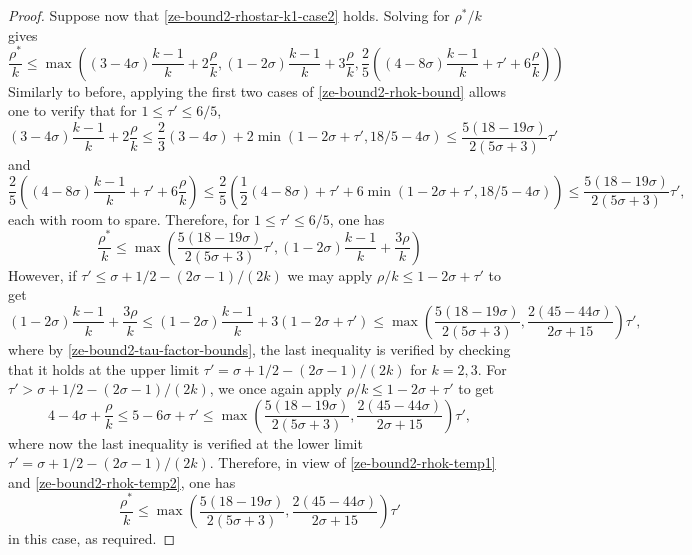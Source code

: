 \begin{proof}
Suppose now that \eqref{ze-bound2-rhostar-k1-case2} holds. Solving for $\rho^*/k$ gives 
\[
\frac{\rho^*}{k} \le \max\left((3 - 4\sigma)\frac{k - 1}{k} + 2\frac{\rho}{k}, (1 - 2\sigma)\frac{k - 1}{k} + 3\frac{\rho}{k}, \frac{2}{5}((4 - 8\sigma)\frac{k - 1}{k} + \tau' + 6\frac{\rho}{k})\right)
\]
Similarly to before, applying the first two cases of \eqref{ze-bound2-rhok-bound} allows one to verify that for $1 \le \tau' \le 6/5$,
\[
(3 - 4\sigma)\frac{k - 1}{k} + 2\frac{\rho}{k} \le \frac{2}{3}(3 - 4\sigma) + 2\min(1 - 2\sigma + \tau', 18/5 - 4\sigma) \le \frac{5(18-19\sigma)}{2(5\sigma+3)}\tau'
\]
and
\[
\frac{2}{5}((4 - 8\sigma)\frac{k - 1}{k} + \tau' + 6\frac{\rho}{k}) \le \frac{2}{5}(\frac{1}{2}(4 - 8\sigma) + \tau' + 6\min(1 - 2\sigma + \tau', 18/5 - 4\sigma)) \le \frac{5(18-19\sigma)}{2(5\sigma+3)}\tau',
\]
each with room to spare. Therefore, for $1 \le \tau' \le 6/5$, one has 
\begin{equation}\label{ze-bound2-rhok-temp2}
\frac{\rho^*}{k} \le \max\left(\frac{5(18 - 19\sigma)}{2(5\sigma + 3)}\tau', (1 - 2\sigma)\frac{k - 1}{k} + \frac{3\rho}{k}\right)
\end{equation}
    However, if $\tau' \le \sigma + 1/2 - (2\sigma - 1)/(2k)$ we may apply $\rho/k \le 1 - 2\sigma + \tau'$ to get 
    \[
    (1 - 2\sigma)\frac{k - 1}{k} + \frac{3\rho}{k} \le (1 - 2\sigma)\frac{k - 1}{k} + 3(1 - 2\sigma + \tau') \le \max\left(\frac{5(18 - 19\sigma)}{2(5\sigma + 3)}, \frac{2(45 - 44\sigma)}{2\sigma + 15}\right)\tau',
    \]
    where by \eqref{ze-bound2-tau-factor-bounds}, the last inequality is verified by checking that it holds at the upper limit $\tau' = \sigma + 1/2 - (2\sigma - 1)/(2k)$ for $k = 2,3$. For $\tau' > \sigma + 1/2 - (2\sigma - 1)/(2k)$, we once again apply $\rho/k \le 1 - 2\sigma + \tau'$ to get 
    \[
    4 - 4\sigma + \frac{\rho}{k} \le 5 - 6\sigma + \tau' \le \max\left(\frac{5(18 - 19\sigma)}{2(5\sigma + 3)}, \frac{2(45 - 44\sigma)}{2\sigma + 15}\right)\tau',
    \]
    where now the last inequality is verified at the lower limit $\tau' = \sigma + 1/2 - (2\sigma - 1)/(2k)$.
    Therefore, in view of \eqref{ze-bound2-rhok-temp1} and \eqref{ze-bound2-rhok-temp2}, one has
    \[
    \frac{\rho^*}{k} \le \max\left(\frac{5(18 - 19\sigma)}{2(5\sigma + 3)}, \frac{2(45 - 44\sigma)}{2\sigma + 15}\right)\tau'
    \]
    in this case, as required. 


\end{proof}
